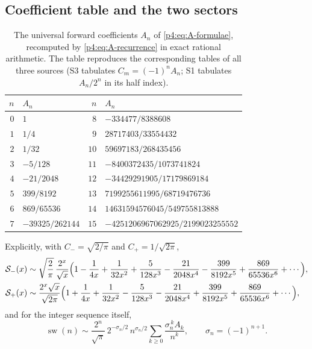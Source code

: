 \documentclass[11pt,a4paper,oneside]{book}
\theoremstyle{plain}
\theoremstyle{definition}
\theoremstyle{remark}
\begin{document}
\subsection{Coefficient table and the two sectors}

\begin{table}[htbp]
\centering
\caption{The universal forward coefficients $A_n$ of \cref{p4:eq:A-formulae},
recomputed by \cref{p4:eq:A-recurrence} in exact rational arithmetic.  The
table reproduces the corresponding tables of all three sources
(\textsf{S3} tabulates $C_m=(-1)^{n}A_n$; \textsf{S1} tabulates
$A_n/2^{n}$ in its half index).}
\label{p4:tab:A}
\small
\begin{tabular}{@{}rl rl@{}}
\toprule
$n$ & $A_n$ & $n$ & $A_n$\\
\midrule
$0$ & $1$ & $8$ & $-334477/8388608$\\
$1$ & $1/4$ & $9$ & $28717403/33554432$\\
$2$ & $1/32$ & $10$ & $59697183/268435456$\\
$3$ & $-5/128$ & $11$ & $-8400372435/1073741824$\\
$4$ & $-21/2048$ & $12$ & $-34429291905/17179869184$\\
$5$ & $399/8192$ & $13$ & $7199255611995/68719476736$\\
$6$ & $869/65536$ & $14$ & $14631594576045/549755813888$\\
$7$ & $-39325/262144$ & $15$ & $-4251206967062925/2199023255552$\\
\bottomrule
\end{tabular}
\end{table}

Explicitly, with $C_-=\sqrt{2/\pi}$ and $C_+=1/\sqrt{2\pi}$,
\begin{align}
  \mathcal S_-(x)&\sim\sqrt{\frac2\pi}\,\frac{2^{x}}{\sqrt x}
  \Bigl(1-\frac1{4x}+\frac1{32x^{2}}+\frac5{128x^{3}}
        -\frac{21}{2048x^{4}}-\frac{399}{8192x^{5}}
        +\frac{869}{65536x^{6}}+\cdots\Bigr),
  \label{p4:eq:even-forward}\\
  \mathcal S_+(x)&\sim\frac{2^{x}\sqrt x}{\sqrt{2\pi}}
  \Bigl(1+\frac1{4x}+\frac1{32x^{2}}-\frac5{128x^{3}}
        -\frac{21}{2048x^{4}}+\frac{399}{8192x^{5}}
        +\frac{869}{65536x^{6}}+\cdots\Bigr),
  \label{p4:eq:odd-forward}
\end{align}
and for the integer sequence itself,
\begin{equation}
  \boxed{\;
  \operatorname{sw}(n)\sim
  \frac{2^{n}}{\sqrt\pi}\,2^{-\sigma_n/2}\,n^{\sigma_n/2}
  \sum_{k\ge0}\frac{\sigma_n^{\,k}A_k}{n^{k}},
  \qquad \sigma_n=(-1)^{n+1}. \;}
  \label{p4:eq:integer-forward}
\end{equation}
\end{document}
